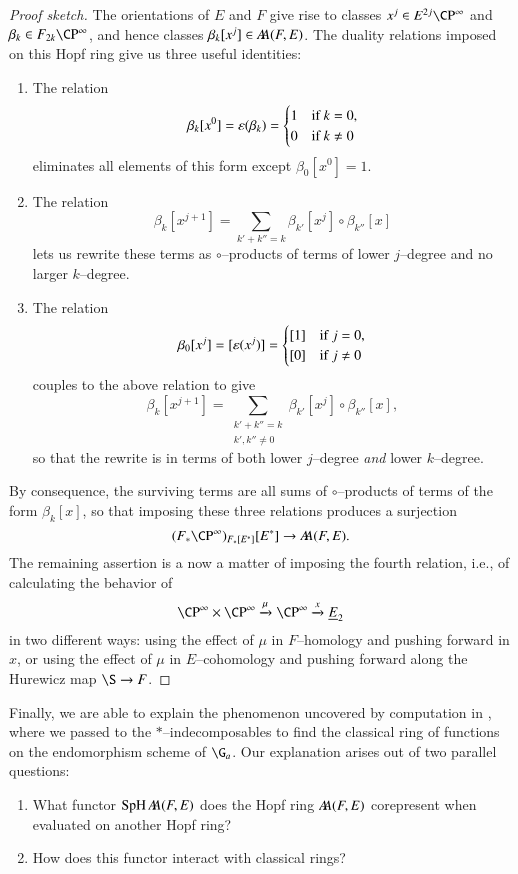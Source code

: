 \begin{proof}[Proof sketch]
The orientations of $E$ and $F$ give rise to classes $x^j \in E^{2j} \CP^\infty$ and $\beta_k \in F_{2k} \CP^\infty$, and hence classes $\beta_k[x^j] \in \AA(F, E)$.  The duality relations imposed on this Hopf ring give us three useful identities:
\begin{enumerate}
    \item The relation \[\beta_k[x^0] = \eps(\beta_k) = \begin{cases} 1 & \text{if $k = 0$}, \\ 0 & \text{if $k \ne 0$}\end{cases}\] eliminates all elements of this form except $\beta_0[x^0] = 1$.
    \item The relation \[\beta_k[x^{j+1}] = \sum_{k' + k'' = k} \beta_{k'}[x^j] \circ \beta_{k''}[x]\] lets us rewrite these terms as $\circ$--products of terms of lower $j$--degree and no larger $k$--degree.
    \item The relation \[\beta_0[x^j] = [\eps(x^j)] = \begin{cases} [1] & \text{if $j = 0$}, \\ [0] & \text{if $j \ne 0$}\end{cases}\] couples to the above relation to give \[\beta_k[x^{j+1}] = \sum_{\substack{k' + k'' = k \\ k', k'' \ne 0}} \beta_{k'}[x^j] \circ \beta_{k''}[x],\] so that the rewrite is in terms of both lower $j$--degree \emph{and} lower $k$--degree.
\end{enumerate}
By consequence, the surviving terms are all sums of $\circ$--products of terms of the form $\beta_k[x]$, so that imposing these three relations produces a surjection \[(F_* \CP^\infty)_{F_*[E^*]}[E^*] \to \AA(F, E).\]  The remaining assertion is a now a matter of imposing the fourth relation, i.e., of calculating the behavior of \[\CP^\infty \times \CP^\infty \xrightarrow{\mu} \CP^\infty \xrightarrow{x} \OS{E}{2}\] in two different ways: using the effect of $\mu$ in $F$--homology and pushing forward in $x$, or using the effect of $\mu$ in $E$--cohomology and pushing forward along the Hurewicz map $\S \to F$.
\end{proof}



Finally, we are able to explain the phenomenon uncovered by computation in , where we passed to the $\ast$--indecomposables to find the classical ring of functions on the endomorphism scheme of $\G_a$.  Our explanation arises out of two parallel questions:
\begin{enumerate}
	\item What functor $\SpH \AA(F, E)$ does the Hopf ring $\AA(F, E)$ corepresent when evaluated on another Hopf ring?
	\item How does this functor interact with classical rings?
\end{enumerate}


